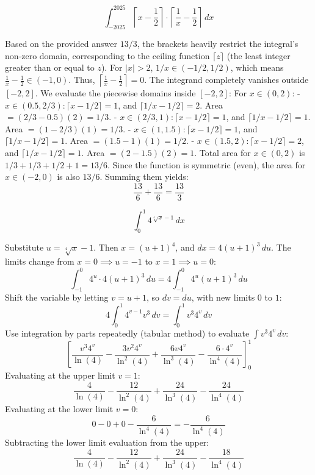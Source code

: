 \begin{questions}
    \question \[ \int_{-2025}^{2025} \left\lceil x - \frac{1}{2} \right\rceil \cdot \left\lceil \frac{1}{x} - \frac{1}{2} \right\rceil \,dx \]
    \begin{solution}
        Based on the provided answer $13/3$, the brackets heavily restrict the integral's non-zero domain, corresponding to the ceiling function $\lceil z \rceil$ (the least integer greater than or equal to $z$). 
        For $|x| > 2$, $1/x \in (-1/2, 1/2)$, which means $\frac{1}{x} - \frac{1}{2} \in (-1, 0)$. Thus, $\left\lceil \frac{1}{x} - \frac{1}{2} \right\rceil = 0$. 
        The integrand completely vanishes outside $[-2, 2]$. We evaluate the piecewise domains inside $[-2, 2]$:
        For $x \in (0, 2)$:
        - $x \in (0.5, 2/3): \lceil x - 1/2 \rceil = 1$, and $\lceil 1/x - 1/2 \rceil = 2$. Area $= (2/3 - 0.5)(2) = 1/3$.
        - $x \in (2/3, 1): \lceil x - 1/2 \rceil = 1$, and $\lceil 1/x - 1/2 \rceil = 1$. Area $= (1 - 2/3)(1) = 1/3$.
        - $x \in (1, 1.5): \lceil x - 1/2 \rceil = 1$, and $\lceil 1/x - 1/2 \rceil = 1$. Area $= (1.5 - 1)(1) = 1/2$.
        - $x \in (1.5, 2): \lceil x - 1/2 \rceil = 2$, and $\lceil 1/x - 1/2 \rceil = 1$. Area $= (2 - 1.5)(2) = 1$.
        Total area for $x \in (0, 2)$ is $1/3 + 1/3 + 1/2 + 1 = 13/6$.
        Since the function is symmetric (even), the area for $x \in (-2, 0)$ is also $13/6$. Summing them yields:
        \[ \frac{13}{6} + \frac{13}{6} = \frac{13}{3} \]
    \end{solution}

    \question \[ \int_0^1 4^{\sqrt[4]{x}-1} \,dx \]
    \begin{solution}
        Substitute $u = \sqrt[4]{x} - 1$. Then $x = (u+1)^4$, and $dx = 4(u+1)^3 \,du$. The limits change from $x=0 \implies u=-1$ to $x=1 \implies u=0$:
        \[ \int_{-1}^0 4^u \cdot 4(u+1)^3 \,du = 4 \int_{-1}^0 4^u (u+1)^3 \,du \]
        Shift the variable by letting $v = u + 1$, so $dv = du$, with new limits $0$ to $1$:
        \[ 4 \int_0^1 4^{v-1} v^3 \,dv = \int_0^1 v^3 4^v \,dv \]
        Use integration by parts repeatedly (tabular method) to evaluate $\int v^3 4^v \,dv$:
        \[ \left[ \frac{v^3 4^v}{\ln(4)} - \frac{3v^2 4^v}{\ln^2(4)} + \frac{6v 4^v}{\ln^3(4)} - \frac{6 \cdot 4^v}{\ln^4(4)} \right]_0^1 \]
        Evaluating at the upper limit $v=1$:
        \[ \frac{4}{\ln(4)} - \frac{12}{\ln^2(4)} + \frac{24}{\ln^3(4)} - \frac{24}{\ln^4(4)} \]
        Evaluating at the lower limit $v=0$:
        \[ 0 - 0 + 0 - \frac{6}{\ln^4(4)} = -\frac{6}{\ln^4(4)} \]
        Subtracting the lower limit evaluation from the upper:
        \[ \frac{4}{\ln(4)} - \frac{12}{\ln^2(4)} + \frac{24}{\ln^3(4)} - \frac{18}{\ln^4(4)} \]
    \end{solution}


\end{questions}
